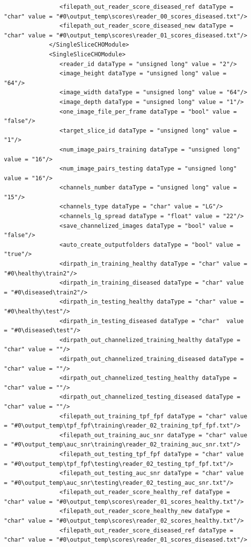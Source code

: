 \begin{lstlisting}
				<filepath_out_reader_score_diseased_ref dataType = "char" value = "#0\output_temp\scores\reader_00_scores_diseased.txt"/>
				<filepath_out_reader_score_diseased_new dataType = "char" value = "#0\output_temp\scores\reader_01_scores_diseased.txt"/>
			 </SingleSliceCHOModule>
			 <SingleSliceCHOModule>
				<reader_id dataType = "unsigned long" value = "2"/>
				<image_height dataType = "unsigned long" value = "64"/>
				<image_width dataType = "unsigned long" value = "64"/>
				<image_depth dataType = "unsigned long" value = "1"/>
				<one_image_file_per_frame dataType = "bool" value = "false"/>
				<target_slice_id dataType = "unsigned long" value = "1"/>
				<num_image_pairs_training dataType = "unsigned long" value = "16"/>
				<num_image_pairs_testing dataType = "unsigned long" value = "16"/>
				<channels_number dataType = "unsigned long" value = "15"/>	
				<channels_type dataType = "char" value = "LG"/>
				<channels_lg_spread dataType = "float" value = "22"/>
				<save_channelized_images dataType = "bool" value = "false"/>
				<auto_create_outputfolders dataType = "bool" value = "true"/>
				<dirpath_in_training_healthy dataType = "char" value = "#0\healthy\train2"/>
				<dirpath_in_training_diseased dataType = "char" value = "#0\diseased\train2"/>
				<dirpath_in_testing_healthy dataType = "char" value = "#0\healthy\test"/>
				<dirpath_in_testing_diseased dataType = "char"  value = "#0\diseased\test"/>
				<dirpath_out_channelized_training_healthy dataType = "char" value = ""/>
				<dirpath_out_channelized_training_diseased dataType = "char" value = ""/>
				<dirpath_out_channelized_testing_healthy dataType = "char" value = ""/>
				<dirpath_out_channelized_testing_diseased dataType = "char" value = ""/>
				<filepath_out_training_tpf_fpf dataType = "char" value = "#0\output_temp\tpf_fpf\training\reader_02_training_tpf_fpf.txt"/>
				<filepath_out_training_auc_snr dataType = "char" value = "#0\output_temp\auc_snr\training\reader_02_training_auc_snr.txt"/>
				<filepath_out_testing_tpf_fpf dataType = "char" value = "#0\output_temp\tpf_fpf\testing\reader_02_testing_tpf_fpf.txt"/>
				<filepath_out_testing_auc_snr dataType = "char" value = "#0\output_temp\auc_snr\testing\reader_02_testing_auc_snr.txt"/>
				<filepath_out_reader_score_healthy_ref dataType = "char" value = "#0\output_temp\scores\reader_01_scores_healthy.txt"/>
				<filepath_out_reader_score_healthy_new dataType = "char" value = "#0\output_temp\scores\reader_02_scores_healthy.txt"/>
				<filepath_out_reader_score_diseased_ref dataType = "char" value = "#0\output_temp\scores\reader_01_scores_diseased.txt"/>

\end{lstlisting}
